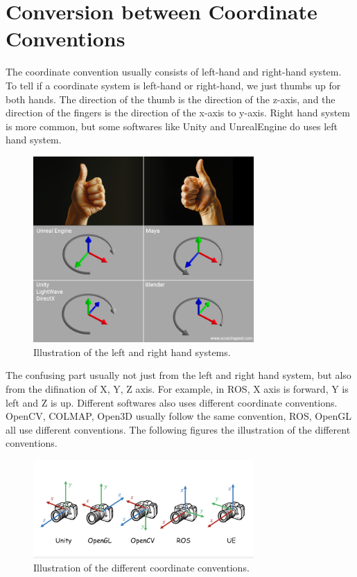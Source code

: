 \documentclass{article}
\begin{document}
\section{Conversion between Coordinate Conventions}
The coordinate convention usually consists of left-hand and right-hand system. To tell if a coordinate system is left-hand or right-hand, we just thumbs up for both hands. The direction of the thumb is the direction of the z-axis, and the direction of the fingers is the direction of the x-axis to y-axis. Right hand system is more common, but some softwares like Unity and UnrealEngine do uses left hand system.
\begin{figure}[h]
    \centering
    \includegraphics[width=0.75\textwidth]{figs/left_right_hand.png}
    \caption{Illustration of the left and right hand systems.}
    \label{fig:left_right_hand}
\end{figure}

The confusing part usually not just from the left and right hand system, but also from the difination of X, Y, Z axis. For example, in ROS, X axis is forward, Y is left and Z is up. Different softwares also uses different coordinate conventions. OpenCV, COLMAP, Open3D usually follow the same convention, ROS, OpenGL all use different conventions. The following figures the illustration of the different conventions.

\begin{figure}[h]
    \centering
    \includegraphics[width=0.75\textwidth]{figs/coord_conventions.png}
    \caption{Illustration of the different coordinate conventions.}
    \label{fig:coordinate_conventions}
\end{figure}
\end{document}

